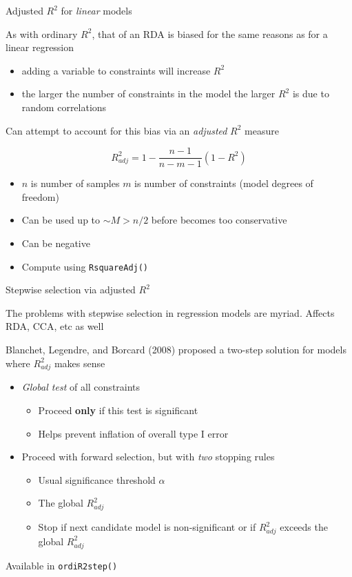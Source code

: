 \documentclass[10pt,ignorenonframetext,compress, aspectratio=169]{beamer}
\providecommand{\tightlist}{%
  \setlength{\itemsep}{0pt}\setlength{\parskip}{0pt}}
\begin{document}
\begin{frame}[fragile]{Adjusted \(R^2\) for \emph{linear} models}

As with ordinary \(R^2\), that of an RDA is biased for the same reasons
as for a linear regression

\begin{itemize}
\tightlist
\item
  adding a variable to constraints will increase \(R^2\)
\item
  the larger the number of constraints in the model the larger \(R^2\)
  is due to random correlations
\end{itemize}

Can attempt to account for this bias via an \emph{adjusted} \(R^2\)
measure

\[R^2_{adj} = 1 - \frac{n - 1}{n - m - 1}(1 - R^2)\]

\begin{itemize}
\tightlist
\item
  \(n\) is number of samples \(m\) is number of constraints (model
  degrees of freedom)
\item
  Can be used up to \(\sim M > n/2\) before becomes too conservative
\item
  Can be negative
\item
  Compute using \texttt{RsquareAdj()}
\end{itemize}

\end{frame}

\begin{frame}[fragile]{Stepwise selection via adjusted \(R^2\)}

The problems with stepwise selection in regression models are myriad.
Affects RDA, CCA, etc as well

Blanchet, Legendre, and Borcard (2008) proposed a two-step solution for
models where \(R^2_{adj}\) makes sense

\begin{itemize}
\tightlist
\item
  \emph{Global test} of all constraints

  \begin{itemize}
  \tightlist
  \item
    Proceed \textbf{only} if this test is significant
  \item
    Helps prevent inflation of overall type I error
  \end{itemize}
\item
  Proceed with forward selection, but with \emph{two} stopping rules

  \begin{itemize}
  \tightlist
  \item
    Usual significance threshold \(\alpha\)
  \item
    The global \(R^2_{adj}\)
  \item
    Stop if next candidate model is non-significant or if \(R^2_{adj}\)
    exceeds the global \(R^2_{adj}\)
  \end{itemize}
\end{itemize}

Available in \texttt{ordiR2step()}

\end{frame}
\end{document}
